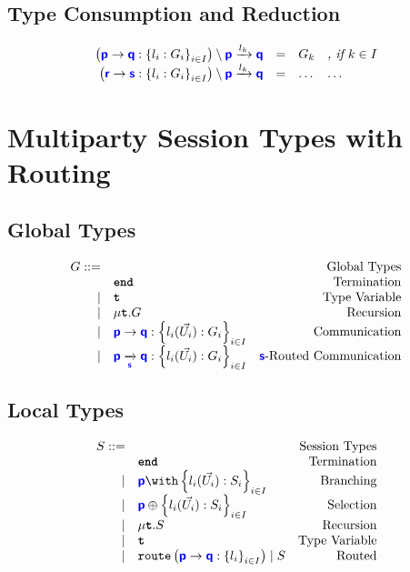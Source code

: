 \documentclass{article}
\begin{document}
\subsection{Type Consumption and Reduction}
\doublespacing
\[
\begin{array}{rcll}
	\tyreduct{\left(\gcomm{p}{q}{l_i: G_i}{i \in I}\right)}{p}{q}{l_k} & = & G_k & \textit{, if $k \in I$}\\
	\tyreduct{\left(\gcomm{r}{s}{l_i: G_i}{i \in I}\right)}{p}{q}{l_k} & = & \dots & \dots \\
\end{array}
\]
\singlespacing

\section{Multiparty Session Types with Routing}

\subsection{Global Types}
\doublespacing
\[
\begin{array}{rlr}
    G ::= & & \text{Global Types} \\
     & \tyend & \text{Termination} \\
	\mid & \tyrecvar & \text{Type Variable} \\
	\mid & \tyrec{G} & \text{Recursion} \\
	\mid & \gcomm{p}{q}{l_i(\vec{U_i}): G_i}{i \in I} & \text{Communication} \\
	\mid & \gcommroute{p}{q}{s}{l_i(\vec{U_i}): G_i}{i \in I} & \text{$\role{s}$-Routed Communication} \\

\end{array}
\]
\singlespacing

\subsection{Local Types}
\doublespacing
\[
\begin{array}{rlr}
    S ::= & & \text{Session Types} \\
     & \tyend & \text{Termination} \\
		\mid & \tybra{p}{l_i(\vec{U_i}): S_i}{i \in I} & \text{Branching} \\
		\mid & \tysel{p}{l_i(\vec{U_i}): S_i}{i \in I} & \text{Selection} \\
		\mid & \tyrec{S} & \text{Recursion} \\
		\mid & \tyrecvar & \text{Type Variable} \\
		\mid & \tyroute{p}{q}{l_i}{i \in I}{S} & \text{Routed} \\
\end{array}
\]
\singlespacing
\end{document}
